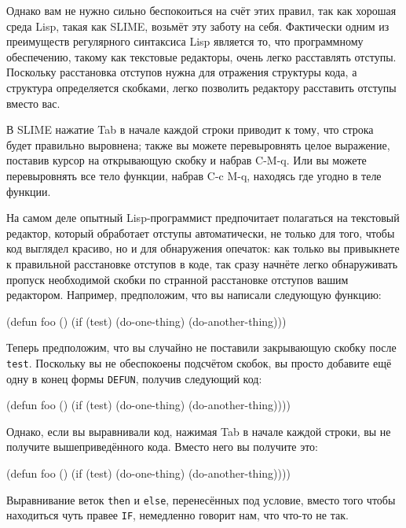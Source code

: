Однако вам не нужно сильно беспокоиться на счёт этих правил, так как хорошая среда Lisp,
такая как SLIME, возьмёт эту заботу на себя. Фактически одним из преимуществ регулярного
синтаксиса Lisp является то, что программному обеспечению, такому как текстовые редакторы,
очень легко расставлять отступы. Поскольку расстановка отступов нужна для отражения
структуры кода, а структура определяется скобками, легко позволить редактору расставить
отступы вместо вас.

В SLIME нажатие Tab в начале каждой строки приводит к тому, что строка будет правильно
выровнена; также вы можете перевыровнять целое выражение, поставив курсор на открывающую
скобку и набрав C-M-q. Или вы можете перевыровнять все тело функции, набрав C-c M-q,
находясь где угодно в теле функции.

На самом деле опытный Lisp-программист предпочитает полагаться на текстовый редактор,
который обработает отступы автоматически, не только для того, чтобы код выглядел красиво,
но и для обнаружения опечаток: как только вы привыкнете к правильной расстановке отступов
в коде, так сразу начнёте легко обнаруживать пропуск необходимой скобки по странной
расстановке отступов вашим редактором. Например, предположим, что вы написали следующую
функцию:

\begin{myverb}
  (defun foo ()
    (if (test)
      (do-one-thing)
      (do-another-thing)))
\end{myverb}

Теперь предположим, что вы случайно не поставили закрывающую скобку после
\lstinline{test}. Поскольку вы не обеспокоены подсчётом скобок, вы просто добавите ещё одну в
конец формы \lstinline{DEFUN}, получив следующий код:

\begin{myverb}
  (defun foo ()
    (if (test)
      (do-one-thing)
      (do-another-thing))))
\end{myverb}

Однако, если вы выравнивали код, нажимая Tab в начале каждой строки, вы не получите
вышеприведённого кода. Вместо него вы получите это:

\begin{myverb}
  (defun foo ()
    (if (test)
         (do-one-thing)
         (do-another-thing))))
\end{myverb}

Выравнивание веток \lstinline{then} и \lstinline{else}, перенесённых под условие, вместо того чтобы
находиться чуть правее \lstinline{IF}, немедленно говорит нам, что что-то не так.

